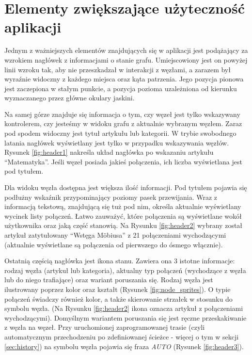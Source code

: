 \section{Elementy zwiększające użyteczność aplikacji}
\label{sec:elementy}
Jednym z ważniejszych elementów znajdujących się w aplikacji jest podążający za wzrokiem nagłówek z informacjami o stanie grafu. Umiejscowiony jest on powyżej linii wzroku tak, aby nie przeszkadzał w interakcji z węzłami, a zarazem był wyraźnie widoczny z każdego miejsca oraz kąta patrzenia. Jego pozycja pionowa jest zaczepiona w stałym punkcie, a pozycja pozioma uzależniona od kierunku wyznaczanego przez główne okulary jaskini.

Na samej górze znajduje się informacja o tym, czy węzeł jest tylko wskazywany kontrolerem, czy jesteśmy w widoku grafu z aktualnie wybranym węzłem. Zaraz pod spodem widoczny jest tytuł artykułu lub kategorii. W trybie swobodnego latania nagłówek wyświetlany jest tylko w przypadku wskazywania węzłów. Rysunek \ref{fig:header1} nakreśla układ nagłówka po wskazaniu artykułu ``Matematyka''. Jeśli węzeł posiada jakieś połączenia, ich liczba wyświetlana jest pod tytułem.


Dla widoku węzła dostępna jest większa ilość informacji. Pod tytułem pojawia się podłużny wskaźnik przypominający poziomy pasek przewijania. Wraz z informacją tekstową, znajdującą się tuż pod nim, określa aktualnie wyświetlany wycinek listy połączeń. Łatwo zauważyć, które połączenia są wyświetlane wokół użytkownika oraz jaką część stanowią. Na Rysunku \ref{fig:header2} wybrany został artykuł zatytułowany ``Wstęga Möbiusa'' z 21 połączeniami wychodzącymi (aktualnie wyświetlane są połączenia od pierwszego do ósmego włącznie).


Ostatnią częścią nagłówka jest ikona stanu. Zawiera ona 3 istotne informacje: rodzaj węzła (artykuł lub kategoria), aktualny typ połączeń (wychodzące z węzła lub do niego trafiające) oraz wariant poruszania się. Rodzaj węzła jest ilustrowany poprzez kolor oraz kształt (Rysunek \ref{fig:node_sprites}). O typie połączeń świadczy również kolor, a także skierowanie strzałek w stosunku do symbolu węzła. (Na Rysunku \ref{fig:header2} ikona oznacza artykuł z połączeniami wychodzącymi). Domyślnym wariantem poruszania się jest ręczne przeskakiwanie z węzła na węzeł. Przy uruchomionej zaprogramowanej trasie (czyli automatycznym przechodzeniu po zdefiniowanej ścieżce - więcej o tym w sekcji \ref{sec:history}) na symbolu węzła pojawia się fraza \textit{AUTO} (Rysunek \ref{fig:header3}).


